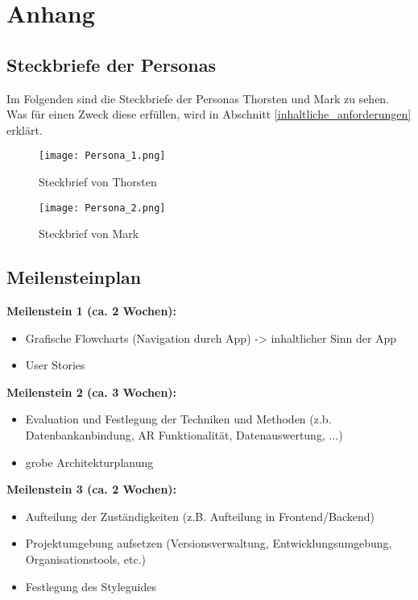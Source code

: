 \chapter{Anhang}\label{app:anhang}
\section{Steckbriefe der Personas}\label{persona}
Im Folgenden sind die Steckbriefe der Personas Thorsten und Mark zu sehen. Was für einen Zweck diese erfüllen, wird in Abschnitt \ref{inhaltliche_anforderungen} erklärt.

\begin{figure}[!htb]
  \texttt{[image: Persona\_1.png]}
  \caption{Steckbrief von Thorsten}\label{fig:persona_thorsten}
\endminipage\hfill
{}
  \texttt{[image: Persona\_2.png]}
  \caption{Steckbrief von Mark}\label{fig:persona_mark}
\endminipage\hfill
\end{figure}

\section{Meilensteinplan}\label{Meilensteinplan}

\textbf{Meilenstein 1  (ca. 2 Wochen):}
\begin{itemize}
\item Grafische Flowcharts (Navigation durch App) -> inhaltlicher Sinn der App
\item User Stories
\end{itemize}

\textbf{Meilenstein 2  (ca. 3 Wochen):}
\begin{itemize}
\item Evaluation und Festlegung der Techniken und Methoden (z.b. Datenbankanbindung, AR Funktionalität, Datenauswertung, ...)
\item grobe Architekturplanung
\end{itemize}

\textbf{Meilenstein 3  (ca. 2 Wochen):}
\begin{itemize}
\item Aufteilung der Zuständigkeiten (z.B. Aufteilung in Frontend/Backend)
\item Projektumgebung aufsetzen (Versionsverwaltung, Entwicklungsumgebung, Organisationstools, etc.)
\item Festlegung des Styleguides
\end{itemize}

